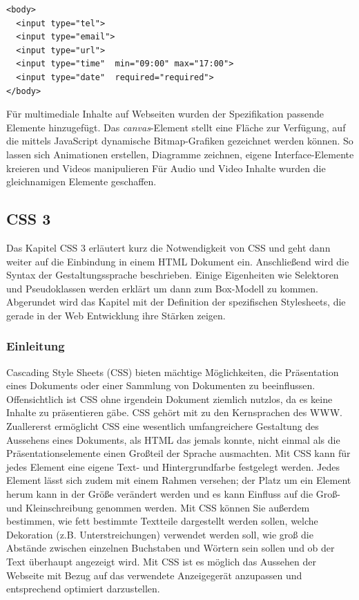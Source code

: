     \vspace{1em}
    \lstset{language=html}
	\begin{lstlisting}[frame=htrbl, caption=HTML 5 \textit{input}-Element, label=lst:html5input]
<body>
  <input type="tel">
  <input type="email">
  <input type="url">  
  <input type="time"  min="09:00" max="17:00">
  <input type="date"  required="required">
</body>
	\end{lstlisting}
	
Für multimediale Inhalte auf Webseiten wurden der Spezifikation passende Elemente hinzugefügt. Das \textit{canvas}-Element \glqq [...] stellt eine Fläche zur Verfügung, auf die mittels JavaScript dynamische Bitmap-Grafiken gezeichnet werden können. So lassen sich Animationen erstellen, Diagramme zeichnen, eigene Interface-Elemente kreieren und Videos manipulieren\grqq{}\cite[S.353]{KronHTML2011} Für Audio und Video Inhalte wurden die gleichnamigen Elemente geschaffen. 
	
\subsection{CSS 3}
Das Kapitel CSS 3 erläutert kurz die Notwendigkeit von CSS und geht dann weiter auf die Einbindung in einem HTML Dokument ein. Anschließend wird die Syntax der Gestaltungssprache beschrieben. Einige Eigenheiten wie Selektoren und Pseudoklassen werden erklärt um dann zum Box-Modell zu kommen. Abgerundet wird das Kapitel mit der Definition der spezifischen Stylesheets, die gerade in der Web Entwicklung ihre Stärken zeigen.

\subsubsection{Einleitung}
\glqq Cascading Style Sheets (CSS) bieten mächtige Möglichkeiten, die Präsentation eines Dokuments oder einer Sammlung von Dokumenten zu beeinflussen. Offensichtlich ist CSS ohne irgendein Dokument ziemlich nutzlos, da es keine Inhalte zu präsentieren gäbe.\grqq{}\cite[S.1]{MeyeCasc2005} CSS gehört mit zu den Kernsprachen des WWW. \glqq Zuallererst ermöglicht CSS eine wesentlich umfangreichere Gestaltung des Aussehens eines Dokuments, als HTML das jemals konnte, nicht einmal als die Präsentationselemente einen Großteil der Sprache ausmachten. Mit CSS kann für jedes Element eine eigene Text- und Hintergrundfarbe festgelegt werden. Jedes Element lässt sich zudem mit einem Rahmen versehen; der Platz um ein Element herum kann in der Größe verändert werden und es kann Einfluss auf die Groß- und Kleinschreibung genommen werden. Mit CSS können Sie außerdem  bestimmen, wie fett bestimmte Textteile dargestellt werden sollen, welche Dekoration (z.B. Unterstreichungen) verwendet werden soll, wie groß die Abstände zwischen einzelnen Buchstaben und Wörtern sein sollen und ob der Text überhaupt angezeigt wird.\grqq{}\cite[S.4]{MeyeCasc2005} Mit CSS ist es möglich das Aussehen der Webseite mit Bezug auf das verwendete Anzeigegerät anzupassen und entsprechend optimiert darzustellen.

